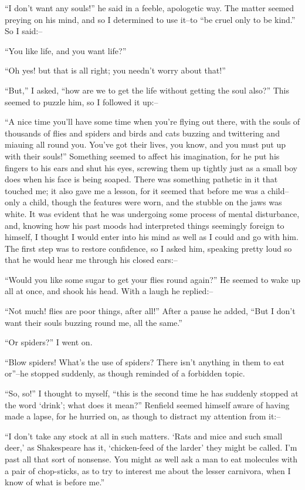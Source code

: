 \documentclass[12pt,openright]{book}
\begin{document}
“I don’t want any souls!” he said in a feeble, apologetic way. The matter seemed preying on his mind, and so I determined to use it–to “be cruel only to be kind.” So I said:–

“You like life, and you want life?”

“Oh yes! but that is all right; you needn’t worry about that!”

“But,” I asked, “how are we to get the life without getting the soul also?” This seemed to puzzle him, so I followed it up:–

“A nice time you’ll have some time when you’re flying out there, with the souls of thousands of flies and spiders and birds and cats buzzing and twittering and miauing all round you. You’ve got their lives, you know, and you must put up with their souls!” Something seemed to affect his imagination, for he put his fingers to his ears and shut his eyes, screwing them up tightly just as a small boy does when his face is being soaped. There was something pathetic in it that touched me; it also gave me a lesson, for it seemed that before me was a child–only a child, though the features were worn, and the stubble on the jaws was white. It was evident that he was undergoing some process of mental disturbance, and, knowing how his past moods had interpreted things seemingly foreign to himself, I thought I would enter into his mind as well as I could and go with him. The first step was to restore confidence, so I asked him, speaking pretty loud so that he would hear me through his closed ears:–

“Would you like some sugar to get your flies round again?” He seemed to wake up all at once, and shook his head. With a laugh he replied:–

“Not much! flies are poor things, after all!” After a pause he added, “But I don’t want their souls buzzing round me, all the same.”

“Or spiders?” I went on.

“Blow spiders! What’s the use of spiders? There isn’t anything in them to eat or”–he stopped suddenly, as though reminded of a forbidden topic.

“So, so!” I thought to myself, “this is the second time he has suddenly stopped at the word ‘drink’; what does it mean?” Renfield seemed himself aware of having made a lapse, for he hurried on, as though to distract my attention from it:–

“I don’t take any stock at all in such matters. ‘Rats and mice and such small deer,’ as Shakespeare has it, ‘chicken-feed of the larder’ they might be called. I’m past all that sort of nonsense. You might as well ask a man to eat molecules with a pair of chop-sticks, as to try to interest me about the lesser carnivora, when I know of what is before me.”
\end{document}
